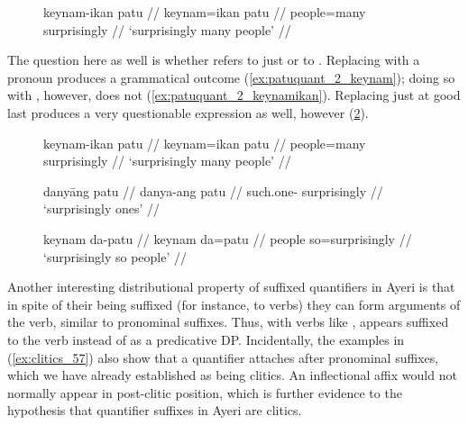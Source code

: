 \begin{figure}[h]
\ex\label{ex:patuquant_1}\begingl
	\gla keynam-ikan patu //
	\glb keynam=ikan patu //
	\glc people=many surprisingly //
	\glft `surprisingly many people' //
\endgl\xe
\end{figure}

The question here as well is whether  refers to just 
 or to . 
Replacing  with a pronoun produces a grammatical outcome
(\ref{ex:patuquant_2_keynam}); doing so with ,
however, does not (\ref{ex:patuquant_2_keynamikan}). Replacing just 
 at good last produces a very questionable expression as
well, however (\ref{ex:patuquant_2_ikan}).

\begin{figure}[h]
\pex\label{ex:patuquant_2}
\a\label{ex:patuquant_2_keynam}\begingl
	\gla keynam-ikan patu //
	\glb keynam=ikan patu //
	\glc people=many surprisingly //
	\glft `surprisingly many people' //
\endgl

\a\label{ex:patuquant_2_keynamikan}\ljudge*\begingl
	\gla danyāng patu //
	\glb danya-ang patu //
	\glc such.one-\Aarg{} surprisingly //
	\glft `surprisingly ones' //
\endgl

\a\label{ex:patuquant_2_ikan}\ljudge\ques\ques\begingl
	\gla keynam da-patu //
	\glb keynam da=patu //
	\glc people so=surprisingly //
	\glft `surprisingly so people' //
\endgl
\xe
\end{figure}

Another interesting distributional property of suffixed quantifiers in Ayeri is
that in spite of their being suffixed (for instance, to verbs) they can form
arguments of the verb, similar to pronominal suffixes. Thus, with verbs like
,  appears suffixed to the verb
instead of as a predicative DP. Incidentally, the examples in
(\ref{ex:clitics_57}) also show that a quantifier attaches after pronominal
suffixes, which we have already established as being clitics. An inflectional
affix would not normally appear in post-clitic position, which is further
evidence to the hypothesis that quantifier suffixes in Ayeri are clitics.

